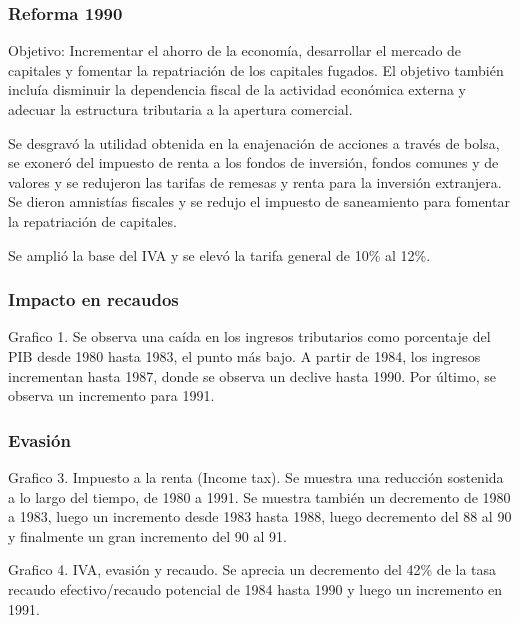 \documentclass[
  12pt]{article}
\theoremstyle{definition}
\theoremstyle{remark}
\begin{document}
\subsubsection{Reforma 1990}\label{reforma-1990}

Objetivo: Incrementar el ahorro de la economía, desarrollar el mercado
de capitales y fomentar la repatriación de los capitales fugados. El
objetivo también incluía disminuir la dependencia fiscal de la actividad
económica externa y adecuar la estructura tributaria a la apertura
comercial.

Se desgravó la utilidad obtenida en la enajenación de acciones a través
de bolsa, se exoneró del impuesto de renta a los fondos de inversión,
fondos comunes y de valores y se redujeron las tarifas de remesas y
renta para la inversión extranjera. Se dieron amnistías fiscales y se
redujo el impuesto de saneamiento para fomentar la repatriación de
capitales.

Se amplió la base del IVA y se elevó la tarifa general de 10\% al 12\%.

\subsubsection{Impacto en recaudos}\label{impacto-en-recaudos}

Grafico 1. Se observa una caída en los ingresos tributarios como
porcentaje del PIB desde 1980 hasta 1983, el punto más bajo. A partir de
1984, los ingresos incrementan hasta 1987, donde se observa un declive
hasta 1990. Por último, se observa un incremento para 1991.

\subsubsection{Evasión}\label{evasiuxf3n}

Grafico 3. Impuesto a la renta (Income tax). Se muestra una reducción
sostenida a lo largo del tiempo, de 1980 a 1991. Se muestra también un
decremento de 1980 a 1983, luego un incremento desde 1983 hasta 1988,
luego decremento del 88 al 90 y finalmente un gran incremento del 90 al
91.

Grafico 4. IVA, evasión y recaudo. Se aprecia un decremento del 42\% de
la tasa recaudo efectivo/recaudo potencial de 1984 hasta 1990 y luego un
incremento en 1991.

\subsection{\texorpdfstring{\citet{Almunia2018}}{@Almunia2018}}\label{almunia2018}
\end{document}
